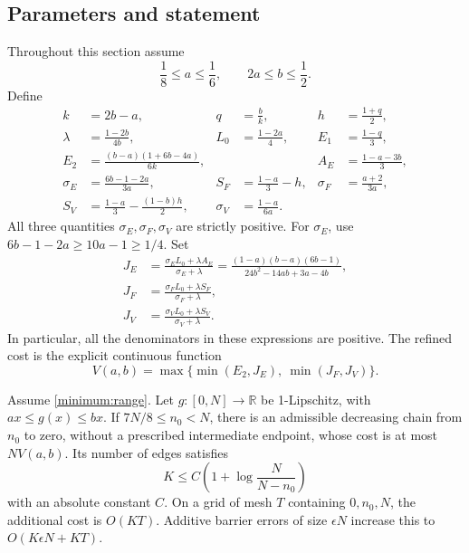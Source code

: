 \subsection{Parameters and statement}

Throughout this section assume
\begin{equation}\label{minimum:range}
 \frac18\le a\le\frac16,\qquad 2a\le b\le\frac12.
\end{equation}
Define
\begin{align*}
 k&=2b-a,&q&=\frac b{k},&h&=\frac{1+q}{2},\\
 \lambda&=\frac{1-2b}{4b},&L_0&=\frac{1-2a}{4},&
 E_1&=\frac{1-q}{3},\\
 E_2&=\frac{(b-a)(1+6b-4a)}{6k},&&&
 A_E&=\frac{1-a-3b}{3},\\
 \sigma_E&=\frac{6b-1-2a}{3a},&
 S_F&=\frac{1-a}{3}-h,&\sigma_F&=\frac{a+2}{3a},\\
 S_V&=\frac{1-a}{3}-\frac{(1-b)h}{2},&
 \sigma_V&=\frac{1-a}{6a}.&&
\end{align*}
All three quantities \(\sigma_E,\sigma_F,\sigma_V\) are strictly positive.
For \(\sigma_E\), use \(6b-1-2a\ge10a-1\ge1/4\).
Set
\begin{align}
 J_E&=\frac{\sigma_E L_0+\lambda A_E}{\sigma_E+\lambda}
     =\frac{(1-a)(b-a)(6b-1)}{24b^2-14ab+3a-4b},
       \label{minimum:JE}\\
 J_F&=\frac{\sigma_F L_0+\lambda S_F}{\sigma_F+\lambda},
       \label{minimum:JF}\\
 J_V&=\frac{\sigma_V L_0+\lambda S_V}{\sigma_V+\lambda}.
       \label{minimum:JV}
\end{align}
In particular, all the denominators in these expressions are positive.
The refined cost is the explicit continuous function
\begin{equation}\label{minimum:cost}
 V(a,b)=\max\bigl\{\min(E_2,J_E),\ \min(J_F,J_V)\bigr\}.
\end{equation}

\begin{lemma}\label{minimum:profile}
Assume \eqref{minimum:range}. Let \(g:[0,N]\to\mathbb R\) be
1-Lipschitz, with \(ax\le g(x)\le bx\). If
\(7N/8\le n_0<N\), there is an admissible decreasing chain from
\(n_0\) to zero, without a prescribed intermediate endpoint, whose cost
is at most \(NV(a,b)\). Its number of edges satisfies
\[
 K\le C\left(1+\log\frac{N}{N-n_0}\right)
\]
with an absolute constant \(C\). On a grid of mesh \(T\) containing
\(0,n_0,N\), the additional cost is \(O(KT)\). Additive barrier errors
of size \(\epsilon N\) increase this to
\(O(K\epsilon N+KT)\).
\end{lemma}

